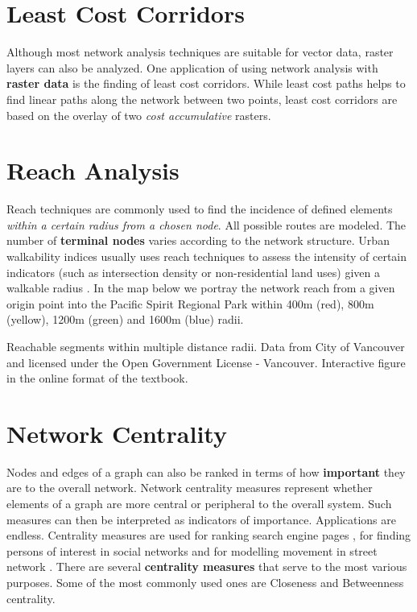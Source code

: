 \documentclass[
]{book}
\begin{document}
\hypertarget{least-cost-corridors}{%
\section{Least Cost Corridors}\label{least-cost-corridors}}

Although most network analysis techniques are suitable for vector data, raster layers can also be analyzed. One application of using network analysis with \textbf{raster data} is the finding of least cost corridors. While least cost paths helps to find linear paths along the network between two points, least cost corridors are based on the overlay of two \emph{cost accumulative} rasters.

\hypertarget{reach-analysis}{%
\section{Reach Analysis}\label{reach-analysis}}

Reach techniques are commonly used to find the incidence of defined elements \emph{within a certain radius from a chosen node}. All possible routes are modeled. The number of \textbf{terminal nodes} varies according to the network structure. Urban walkability indices usually uses reach techniques to assess the intensity of certain indicators (such as intersection density or non-residential land uses) given a walkable radius \citep{martinoSpatialNetworkAnalysis2020}. In the map below we portray the network reach from a given origin point into the Pacific Spirit Regional Park within 400m (red), 800m (yellow), 1200m (green) and 1600m (blue) radii.

\label{fig:unnamed-chunk-23}Reachable segments within multiple distance radii. Data from City of Vancouver and licensed under the Open Government License - Vancouver. Interactive figure in the online format of the textbook.

\hypertarget{network-centrality}{%
\section{Network Centrality}\label{network-centrality}}

Nodes and edges of a graph can also be ranked in terms of how \textbf{important} they are to the overall network. Network centrality measures represent whether elements of a graph are more central or peripheral to the overall system. Such measures can then be interpreted as indicators of importance. Applications are endless. Centrality measures are used for ranking search engine pages \citep{wikimediaPageRank2021}, for finding persons of interest in social networks \citep{ajorlouIntroductionNetworkModels2018} and for modelling movement in street network \citep{hillierNaturalMovementConfiguration1993}. There are several \textbf{centrality measures} that serve to the most various purposes. Some of the most commonly used ones are Closeness and Betweenness centrality.
\end{document}
